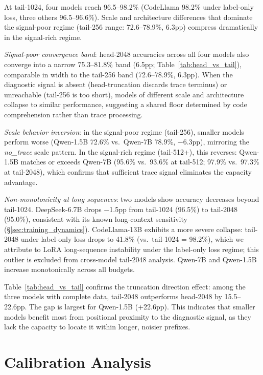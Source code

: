 At tail-1024, four models reach 96.5--98.2\% (CodeLlama 98.2\% under label-only loss, three others 96.5--96.6\%).
Scale and architecture differences that dominate the signal-poor regime (tail-256 range: 72.6--78.9\%, 6.3pp) compress dramatically in the signal-rich regime.

\emph{Signal-poor convergence band}: head-2048 accuracies across all four models also converge into a narrow 75.3--81.8\% band (6.5pp; Table~\ref{tab:head_vs_tail}), comparable in width to the tail-256 band (72.6--78.9\%, 6.3pp).
When the diagnostic signal is absent (head-truncation discards trace terminus) or unreachable (tail-256 is too short), models of different scale and architecture collapse to similar performance, suggesting a shared floor determined by code comprehension rather than trace processing.

\emph{Scale behavior inversion}: in the signal-poor regime (tail-256), smaller models perform worse (Qwen-1.5B 72.6\% vs.\ Qwen-7B 78.9\%, $-$6.3pp), mirroring the \textit{no\_trace} scale pattern.
In the signal-rich regime (tail-512+), this reverses: Qwen-1.5B matches or exceeds Qwen-7B (95.6\% vs.\ 93.6\% at tail-512; 97.9\% vs.\ 97.3\% at tail-2048), which confirms that sufficient trace signal eliminates the capacity advantage.

\emph{Non-monotonicity at long sequences}: two models show accuracy decreases beyond tail-1024.
DeepSeek-6.7B drops $-$1.5pp from tail-1024 (96.5\%) to tail-2048 (95.0\%), consistent with its known long-context sensitivity (\S\ref{sec:training_dynamics}).
CodeLlama-13B exhibits a more severe collapse: tail-2048 under label-only loss drops to 41.8\% (vs.\ tail-1024 = 98.2\%), which we attribute to LoRA long-sequence instability under the label-only loss regime; this outlier is excluded from cross-model tail-2048 analysis.
Qwen-7B and Qwen-1.5B increase monotonically across all budgets.

Table~\ref{tab:head_vs_tail} confirms the truncation direction effect: among the three models with complete data, tail-2048 outperforms head-2048 by 15.5--22.6pp.
The gap is largest for Qwen-1.5B (+22.6pp). This indicates that smaller models benefit most from positional proximity to the diagnostic signal, as they lack the capacity to locate it within longer, noisier prefixes.

\section{Calibration Analysis}
\label{sec:calibration_full}

